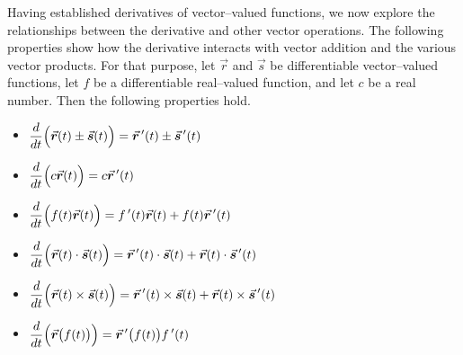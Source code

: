 Having established derivatives of vector--valued functions, we now explore the relationships between the derivative and other vector operations. The following properties show how the derivative interacts with vector addition and the various vector products. For that purpose, let $\vec r$ and $\vec s$ be differentiable vector--valued functions, let $f$ be a differentiable real--valued function, and let $c$ be a real number. Then the following properties hold. 

\begin{multicols}{2}
\begin{itemize}
	\item $\ds \frac{d}{dt}\Big(\vec r(t) \pm \vec s(t)\Big) = \vrp(t) \pm \vec s\,'(t)$
	\item $\ds \frac{d}{dt}\Big(c\vec r(t)\Big) = c\vrp(t)$
	\item $\ds \frac{d}{dt}\Big(f(t)\vec r(t)\Big) = \fp(t)\vec r(t) + f(t)\vrp(t)$
	\item $\ds \frac{d}{dt}\Big(\vec r(t)\cdot \vec s(t) \Big) = \vrp(t)\cdot \vec s(t) + \vec r(t)\cdot \vec s\,'(t)$
	\item $\ds \frac{d}{dt}\Big(\vec r(t)\times \vec s(t) \Big) = \vrp(t)\times \vec s(t) + \vec r(t)\times \vec s\,'(t)$
	\item $\ds \frac{d}{dt}\Big(\vec r\big(f(t)\big)\Big) = \vrp\big(f(t)\big)\fp(t)$
	\end{itemize}
\end{multicols}	
	
